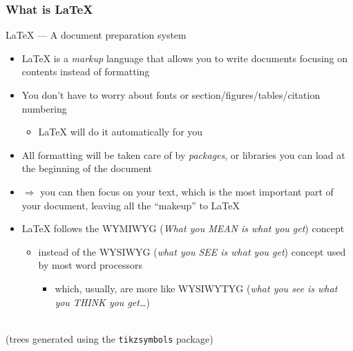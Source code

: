 \documentclass{beamer}
\begin{document}
\begin{frame}
 \frametitle{What is \LaTeX}
  


\centering

{\Huge \LaTeX{} --- A document preparation system}


\vspace{ 5mm }


\begin{itemize}
  \item \LaTeX{} is a \emph{markup} language that allows you to write documents focusing on contents instead of formatting
  \item You don't have to worry about fonts or section/figures/tables/citation numbering
\begin{itemize}
  \item \LaTeX{} will do it automatically for you
\end{itemize}
  \item All formatting will be taken care of by \emph{packages}, or libraries you can load at the beginning of the document
  \item $\Rightarrow$ you can then focus on your text, which is the most important part of your document, leaving all the ``makeup'' to \LaTeX
\end{itemize}

\begin{itemize}
  \item \LaTeX{} follows the WYMIWYG (\emph{What you MEAN is what you get}) concept
\begin{itemize}
  \item instead of the WYSIWYG (\emph{what you SEE is what you get}) concept used by most word processors
\begin{itemize}
  \item which, usually, are more like WYSIWYTYG (\emph{what you see is what you THINK you get\ldots})
\end{itemize}
\end{itemize}
\end{itemize}


\vspace{ 5mm }


\Springtree[10] \quad \Summertree[10] \quad \Autumntree[10] \quad \Wintertree[10]\\
{\tiny (trees generated using the \texttt{tikzsymbols} package)}

  
\end{frame}
\end{document}
